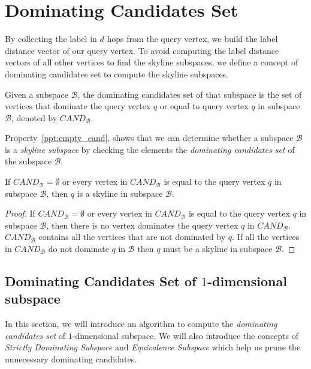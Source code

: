\section{Dominating Candidates Set}
\label{sec:bfs-collect}

By collecting the label in $d$ hops from the query vertex, we build the label distance vector of our query vertex. To avoid computing the label distance vectors of all other vertices to find the skyline subspaces, we define a concept of dominating candidates set to compute the skyline subspaces.

\begin{definition}
Given a subspace $\mathcal{B}$, the dominating candidates set of that subspace is the set of vertices that dominate the query vertex $q$ or equal to query vertex $q$ in subspace $\mathcal{B}$, denoted by $\mathit{CAND}_\mathcal{B}$.
\end{definition}

Property~\ref{ppt:empty_cand}, shows that we can determine whether a subspace $\mathcal{B}$ is a \emph{skyline subspace} by checking the elements the \emph{dominating candidates set} of the subspace $\mathcal{B}$.

\begin{property}
\label{ppt:empty_cand}
If $\mathit{CAND}_\mathcal{B} = \emptyset$ or every vertex in $\mathit{CAND}_\mathcal{B}$ is equal to the query vertex $q$ in subspace $\mathcal{B}$, then $q$ is a skyline in subspace $\mathcal{B}$.
\end{property}

\begin{proof}
If $\mathit{CAND}_\mathcal{B} = \emptyset$ or every vertex in $\mathit{CAND}_\mathcal{B}$ is equal to the query vertex $q$ in subspace $\mathcal{B}$, then there is no vertex dominates the query vertex $q$ in $\mathit{CAND}_\mathcal{B}$.
$\mathit{CAND}_\mathcal{B}$ contains all the vertices that are not dominated by $q$. If all the vertices in $\mathit{CAND}_\mathcal{B}$ do not dominate $q$ in $\mathcal{B}$ then $q$ must be a skyline in subspace $\mathcal{B}$.
\end{proof}

\subsection{Dominating Candidates Set of $1$-dimensional subspace}

In this section, we will introduce an algorithm to compute the \emph{dominating candidates set} of $1$-dimensional subspace. We will also introduce the concepts of \emph{Strictly Dominating Subspace} and \emph{Equivalence Subspace} which help us prune the unnecessary dominating candidates.

